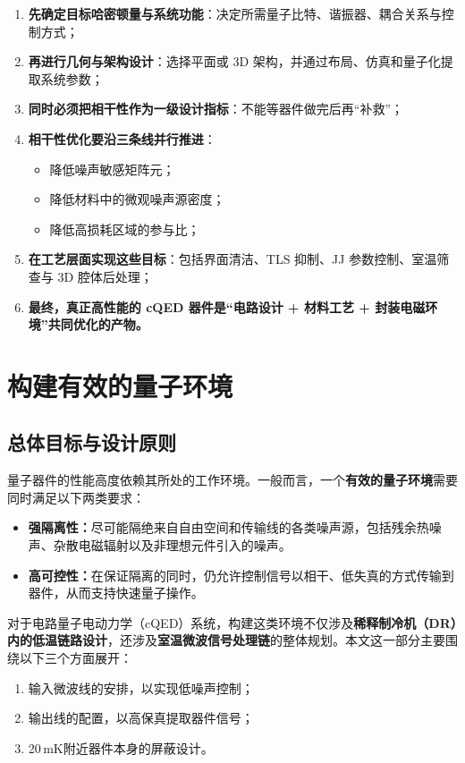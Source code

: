 \documentclass[12pt,a4paper,oneside]{ctexbook}
\begin{document}
\begin{enumerate}
    \item \textbf{先确定目标哈密顿量与系统功能}：决定所需量子比特、谐振器、耦合关系与控制方式；
    \item \textbf{再进行几何与架构设计}：选择平面或 3D 架构，并通过布局、仿真和量子化提取系统参数；
    \item \textbf{同时必须把相干性作为一级设计指标}：不能等器件做完后再“补救”；
    \item \textbf{相干性优化要沿三条线并行推进}：
    \begin{itemize}
        \item 降低噪声敏感矩阵元；
        \item 降低材料中的微观噪声源密度；
        \item 降低高损耗区域的参与比；
    \end{itemize}
    \item \textbf{在工艺层面实现这些目标}：包括界面清洁、TLS 抑制、JJ 参数控制、室温筛查与 3D 腔体后处理；
    \item \textbf{最终，真正高性能的 cQED 器件是“电路设计 + 材料工艺 + 封装电磁环境”共同优化的产物。}
\end{enumerate}
\section{构建有效的量子环境}

\subsection{总体目标与设计原则}

量子器件的性能高度依赖其所处的工作环境。一般而言，一个\textbf{有效的量子环境}需要同时满足以下两类要求：

\begin{itemize}
    \item \textbf{强隔离性：}尽可能隔绝来自自由空间和传输线的各类噪声源，包括残余热噪声、杂散电磁辐射以及非理想元件引入的噪声。
    \item \textbf{高可控性：}在保证隔离的同时，仍允许控制信号以相干、低失真的方式传输到器件，从而支持快速量子操作。
\end{itemize}

对于电路量子电动力学（cQED）系统，构建这类环境不仅涉及\textbf{稀释制冷机（DR）内的低温链路设计}，还涉及\textbf{室温微波信号处理链}的整体规划。本文这一部分主要围绕以下三个方面展开：

\begin{enumerate}
    \item 输入微波线的安排，以实现低噪声控制；
    \item 输出线的配置，以高保真提取器件信号；
    \item 20\,mK附近器件本身的屏蔽设计。
\end{enumerate}
\end{document}
